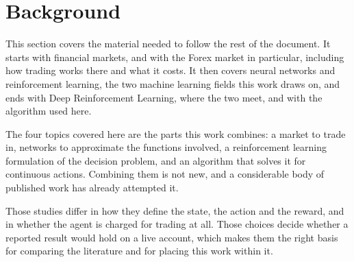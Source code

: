 \section{Background}
\label{Section:Background}

This section covers the material needed to follow the rest of the document. It starts with financial markets, and with the Forex market in particular, including how trading works there and what it costs. It then covers neural networks and reinforcement learning, the two machine learning fields this work draws on, and ends with Deep Reinforcement Learning, where the two meet, and with the algorithm used here.









The four topics covered here are the parts this work combines: a market to trade in, networks to approximate the functions involved, a reinforcement learning formulation of the decision problem, and an algorithm that solves it for continuous actions. Combining them is not new, and a considerable body of published work has already attempted it.

Those studies differ in how they define the state, the action and the reward, and in whether the agent is charged for trading at all. Those choices decide whether a reported result would hold on a live account, which makes them the right basis for comparing the literature and for placing this work within it.